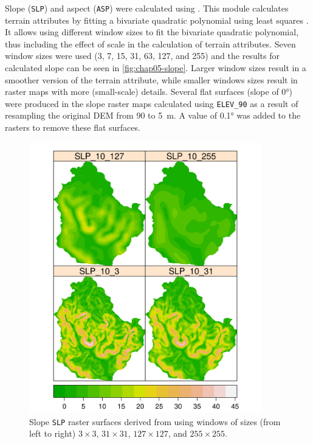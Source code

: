 Slope (\texttt{SLP}) and aspect (\texttt{ASP}) were calculated using . This module 
calculates terrain attributes by fitting a bivariate quadratic polynomial using least squares \cite{Wood1996}. 
It allows using different window sizes to fit the bivariate quadratic polynomial, thus including the effect of 
scale in the calculation of terrain attributes. Seven window sizes were used (3, 7, 15, 31, 63, 127, and 255) 
and the results for calculated slope can be seen in \autoref{fig:chap05-slope}. Larger window sizes result in 
a smoother version of the terrain attribute, while smaller windows sizes result in raster maps with more 
(small-scale) details. Several flat surfaces (slope of \ang{0}) were produced in the slope raster maps 
calculated using \texttt{ELEV\_90} as a result of resampling the original DEM from \num{90} to \SI{5}{\m}. A 
value of \ang{0.1} was added to the rasters to remove these flat surfaces.

\begin{figure}[!ht]
\centering
\includegraphics[width = 0.90\textwidth]{fig/chap05-slope}
\caption[Slope derived using windows of different sizes.]{Slope \texttt{SLP} raster surfaces derived from 
\demNew{} using windows of sizes (from left to right) $3 \times 3$, $31 \times 31$, $127 \times 127$, and $255 
\times 255$.}
\label{fig:chap05-slope}
\end{figure}

